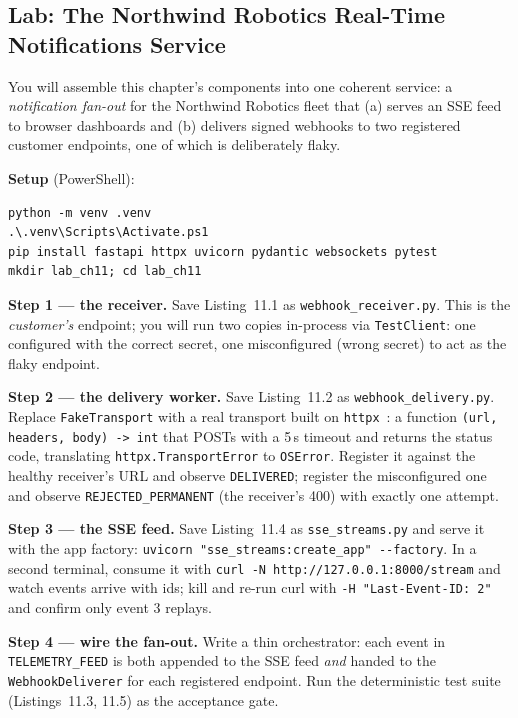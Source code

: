 \subsection{Lab: The Northwind Robotics Real-Time Notifications Service}

You will assemble this chapter's components into one coherent service: a
\emph{notification fan-out} for the Northwind Robotics fleet that (a) serves
an SSE feed to browser dashboards and (b) delivers signed webhooks to two
registered customer endpoints, one of which is deliberately flaky.

\textbf{Setup} (PowerShell):

\begin{verbatim}
python -m venv .venv
.\.venv\Scripts\Activate.ps1
pip install fastapi httpx uvicorn pydantic websockets pytest
mkdir lab_ch11; cd lab_ch11
\end{verbatim}

\textbf{Step 1 --- the receiver.} Save Listing~11.1 as
\texttt{webhook\_receiver.py}. This is the \emph{customer's} endpoint;
you will run two copies in-process via \texttt{TestClient}: one configured
with the correct secret, one misconfigured (wrong secret) to act as the
flaky endpoint.

\textbf{Step 2 --- the delivery worker.} Save Listing~11.2 as
\texttt{webhook\_delivery.py}. Replace \texttt{FakeTransport} with a real
transport built on \texttt{httpx}~\cite{httpxdocs}: a function
\texttt{(url, headers, body) -> int} that POSTs with a 5\,s timeout and
returns the status code, translating \texttt{httpx.TransportError} to
\texttt{OSError}. Register it against the healthy receiver's URL and observe
\texttt{DELIVERED}; register the misconfigured one and observe
\texttt{REJECTED\_PERMANENT} (the receiver's 400) with exactly one attempt.

\textbf{Step 3 --- the SSE feed.} Save Listing~11.4 as
\texttt{sse\_streams.py} and serve it with the app factory:
\texttt{uvicorn "sse\_streams:create\_app" {-}{-}factory}. In a second
terminal, consume it with \texttt{curl -N http://127.0.0.1:8000/stream} and
watch events arrive with ids; kill and re-run curl with
\texttt{-H "Last-Event-ID: 2"} and confirm only event 3 replays.

\textbf{Step 4 --- wire the fan-out.} Write a thin orchestrator: each event
in \texttt{TELEMETRY\_FEED} is both appended to the SSE feed \emph{and}
handed to the \texttt{WebhookDeliverer} for each registered endpoint. Run the
deterministic test suite (Listings~11.3, 11.5) as the acceptance gate.

